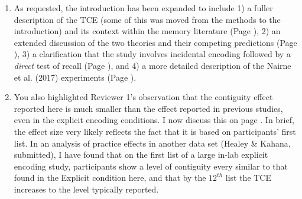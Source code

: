 \documentclass[12pt]{article}
\begin{document}
\begin{enumerate}

\item
	As requested, the introduction has been expanded to include 1) a fuller description of the TCE (some of this was moved from the methods to the introduction) and its context within the memory literature (Page \pageref{TODO-1}), %
	2) an extended discussion of the two theories and their competing predictions (Page \pageref{TODO-2}),
	3) a clarification that the study involves incidental encoding followed by a \emph{direct} test of recall (Page  \pageref{TODO-3}),
	and 4) a more detailed description of the Nairne et al. (2017) experiments (Page \pageref{TODO-4}).

\item
	You also highlighted Reviewer 1's observation that the contiguity effect reported here is much smaller than the effect reported in previous studies, even in the explicit encoding conditions. I now discuss this on page \pageref{TODO-5}. In brief, the effect size very likely reflects the fact that it is based on participants' first list. In an analysis of practice effects in another data set (Healey \& Kahana, submitted), I have found that on the first list of a large in-lab explicit encoding study, participants show a level of contiguity every similar to that found in the Explicit condition here, and that by the $12^{th}$ list the TCE increases to the level typically reported. 


\end{enumerate}
\end{document}
